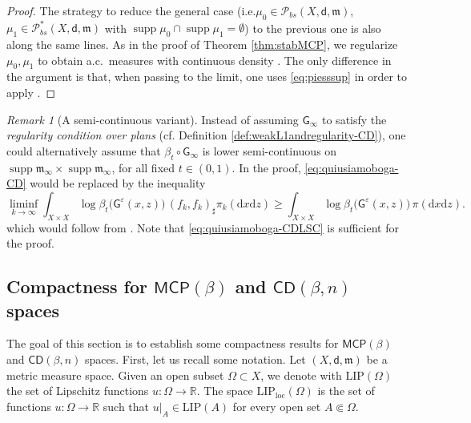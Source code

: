 \documentclass[11pt,a4paper]{article}
\theoremstyle{plain}
\theoremstyle{definition}
\theoremstyle{remark}
\newtheorem{remark}[theorem]{Remark}
\numberwithin{equation}{section}
\newcommand{\R}{\mathbb{R}} %
\DeclareMathOperator{\supp}{\mathrm{supp}}
\newcommand{\ve}{\varepsilon}
\newcommand{\CD}{\mathsf{CD}}
\newcommand{\MCP}{\mathsf{MCP}}
\newcommand{\loc}{\mathrm{loc}}
\newcommand{\Prob}{\mathcal{P}}
\newcommand{\di}{\mathrm{d}}
\newcommand{\mm}{\mathfrak m}
\newcommand{\sfd}{\mathsf d}
\newcommand{\sfG}{\mathsf G}
\begin{document}
\begin{proof}
The strategy to reduce the general case (i.e.\@ $\mu_0\in \mathcal{P}_{bs}(X,\sfd,\mm)$, $\mu_1\in \Prob_{bs}^{*}(X,\sfd,\mm)$ with $\supp \mu_0\cap \supp \mu_1=\emptyset$) to the previous one is also along the same lines. As in the proof of Theorem \ref{thm:stabMCP}, we regularize $\mu_0,\mu_1$ to obtain a.c.\ measures with continuous density \cite[Ch.\ 29, First Appendix]{Vil}. The only difference in the argument is that, when passing to the limit, one uses \eqref{eq:piesssup} in order to apply \cite[Cor.\ 2.2.10]{Bogachev-Weak}.
\end{proof}

\begin{remark}[A semi-continuous variant]
Instead of assuming $\sfG_\infty$ to satisfy the \emph{regularity condition over plans} (cf. Definition \ref{def:weakL1andregularity-CD}), one could alternatively assume that $\beta_{t}\circ \sfG_{\infty}$ is lower semi-continuous on $\supp \mm_{\infty} \times \supp \mm_{\infty}$, for all fixed $t\in (0,1)$. In the proof, \eqref{eq:quiusiamoboga-CD} would be replaced by the inequality
\begin{equation}\label{eq:quiusiamoboga-CDLSC}
\liminf_{k\to \infty}   \int_{X\times X} \log\beta_t\big(\sfG^{\ve}(x,z)\big)\,(f_k,f_k)_\sharp\pi_{k}(\di x \di z)  \geq \int_{X\times X} \log\beta_t\big(\sfG^{\ve}(x,z)\big)\,\pi(\di x\di z).
\end{equation}
which would follow from \cite[Cor.\ 2.2.6]{Bogachev-Weak}.  Note that  \eqref{eq:quiusiamoboga-CDLSC} is sufficient for the proof.
\end{remark}





\subsection{Compactness  for \texorpdfstring{$\MCP(\beta)$}{MCP} and \texorpdfstring{$\CD(\beta,n)$}{CD} spaces}

The goal of this section is to establish some compactness results for $\MCP(\beta)$ and $\CD(\beta,n)$ spaces. First, let us recall some notation. Let $(X,\sfd,\mm)$ be a metric measure space.
Given an open subset $\Omega\subset X$, we denote with $\mathrm{LIP}(\Omega)$ the set of Lipschitz functions $u:\Omega\to \R$. The space $\mathrm{LIP}_{\loc}(\Omega)$ is the set of functions $u:\Omega\to \R$ such that $u|_A \in  \mathrm{LIP}(A)$ for every open set $A \Subset \Omega$.
\end{document}
